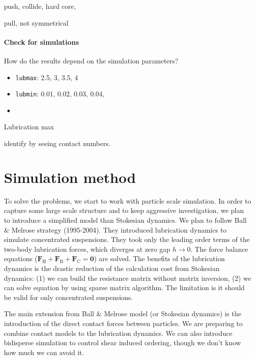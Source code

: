 \documentclass[12pt]{article}
\begin{document}
push, collide, hard core,

pull, not symmetrical


\paragraph{Check for simulations}

How do the results depend on the simulation parameters?

\begin{itemize}
 \item  \texttt{lubmax}: 2.5, 3, 3.5, 4
 \item  \texttt{lubmin}: 0.01, 0.02, 0.03, 0.04,
 \item 

\end{itemize}


Lubrication max 

identify by seeing contact numbers.








\section{Simulation method}

To solve the problems,
we start to work with particle scale simulation.
%
In order to capture some large scale structure
and to keep aggressive investigation,
we plan to introduce a simplified model than Stokesian dynamics.
%
We plan to follow Ball \& Melrose strategy (1995-2004).
%
They introduced lubrication dynamics 
to simulate concentrated suspensions.
%
They took only the leading order terms of 
the two-body lubrication forces,
which diverges at zero gap $h\to 0$.
%
The force balance equations 
($\bm{F}_{\mathrm{H}}+\bm{F}_{\mathrm{B}}+\bm{F}_{\mathrm{C}} = \bm{0}$)
are solved.
%
The benefits of the lubrication dynamics is 
the drastic reduction of the calculation cost from Stokesian dynamics:
(1) we can build the resistance matrix without matrix inversion,
(2) we can solve equation by using sparse matrix algorithm.
%
The limitation is 
it should be valid for only concentrated suspensions.
%


The main extension from Ball \& Melrose model (or Stokesian dynamics)
is the introduction of the direct contact forces between particles.
%
We are preparing to combine contact models 
to the lubrication dynamics.
%
We can also introduce bidisperse simulation
to control shear induced ordering,
though we don't know how much we can avoid it.
\end{document}
